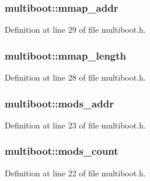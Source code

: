 \subsubsection[{\texorpdfstring{mmap\+\_\+addr}{mmap_addr}}]{ multiboot\+::mmap\+\_\+addr}\hypertarget{structmultiboot_a058132ecf13be63c04fae96cea47d5da}{}\label{structmultiboot_a058132ecf13be63c04fae96cea47d5da}


Definition at line 29 of file multiboot.\+h.

\subsubsection[{\texorpdfstring{mmap\+\_\+length}{mmap_length}}]{ multiboot\+::mmap\+\_\+length}\hypertarget{structmultiboot_afec6f3429e9bd318bdd40713ea720eb1}{}\label{structmultiboot_afec6f3429e9bd318bdd40713ea720eb1}


Definition at line 28 of file multiboot.\+h.

\subsubsection[{\texorpdfstring{mods\+\_\+addr}{mods_addr}}]{ multiboot\+::mods\+\_\+addr}\hypertarget{structmultiboot_abe70fd1a6a91264074d8892a28aecaa1}{}\label{structmultiboot_abe70fd1a6a91264074d8892a28aecaa1}


Definition at line 23 of file multiboot.\+h.

\subsubsection[{\texorpdfstring{mods\+\_\+count}{mods_count}}]{ multiboot\+::mods\+\_\+count}\hypertarget{structmultiboot_ada80fcb4010059d70a52699358c2f532}{}\label{structmultiboot_ada80fcb4010059d70a52699358c2f532}


Definition at line 22 of file multiboot.\+h.

